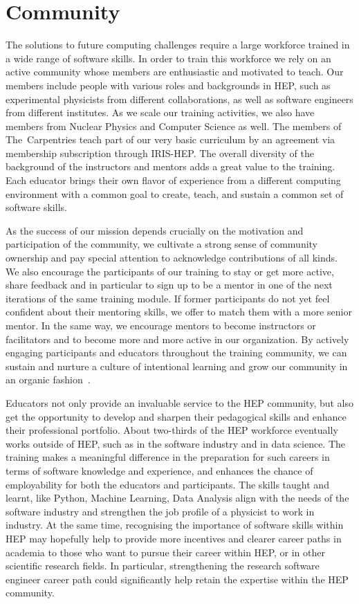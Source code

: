 \documentclass[twocolumn]{svjour3}          %
\begin{document}
\section{Community}\label{sec:Community}
%
The solutions to future computing challenges require a large workforce trained in a wide range of software skills. In order to train this workforce we rely on an active community whose members are enthusiastic and motivated to teach. Our members include people with various roles and backgrounds in HEP, such as experimental physicists from different collaborations, as well as software engineers from different institutes. As we scale our training activities, we also have members from Nuclear Physics and Computer Science as well. The members of The~Carpentries  teach part of our very basic curriculum by an agreement via membership subscription through IRIS-HEP. The overall diversity of the background of the instructors and mentors adds a great value to the training. Each educator brings their own flavor of experience from a different computing environment with a common goal to create, teach, and sustain a common set of software skills.

As the success of our mission depends crucially on the motivation and participation of the community, we cultivate a strong sense of community ownership and pay special attention to acknowledge contributions of all kinds. We also encourage the participants of our training to stay or get more  active, share feedback and in particular to sign up to be a mentor in one of the next iterations of the same training module. If former participants do not yet feel confident about their mentoring skills, we offer to match them with a more senior mentor. In the same way, we encourage mentors to become instructors or facilitators and to become more and more active in our organization. By actively engaging participants and educators throughout the training community, we can sustain and nurture a culture of intentional learning and grow our community in an organic fashion~\cite{hsf-community-building}.

Educators not only provide an invaluable service to the HEP community, but also get the opportunity to develop and sharpen their pedagogical skills and enhance their professional portfolio. About two-thirds of the HEP workforce eventually works outside of HEP, such as in the software industry and in data science. The training makes a meaningful difference in the preparation for such careers in terms of software knowledge and experience, and enhances the chance of employability for both the educators and participants. The skills taught and learnt, like Python, Machine Learning, Data Analysis align with the needs of the software industry and strengthen the job profile of a physicist to work in industry. At the same time, recognising the importance of software skills within HEP may hopefully help to provide more incentives and clearer career paths in academia to those who want to pursue their career within HEP, or in other scientific research fields.
In particular, strengthening the research software engineer career path could significantly help retain the expertise within the HEP community.
\end{document}
